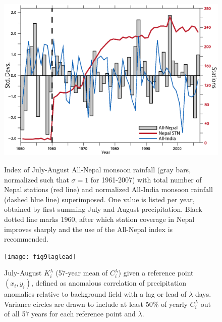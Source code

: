 \documentclass[12pt]{article}
\begin{document}
\begin{figure}[t]
  \noindent\includegraphics[width=36pc,angle=0]{fig8allnepal}\\
  \caption{Index of July-August All-Nepal monsoon rainfall (gray bars, normalized such that $\sigma= 1$ for 1961-2007) with total number of Nepal stations (red line) and normalized All-India monsoon rainfall (dashed blue line) superimposed. One value is listed per year, obtained by first summing July and August precipitation. Black dotted line marks 1960, after which station coverage in Nepal improves sharply and the use of the All-Nepal index is recommended.}\label{f8}
\end{figure}

\begin{figure}[t]
  \noindent\texttt{[image: fig9laglead]}\\
  \caption{July-August $K_i^\lambda$ (57-year mean of $C_i^\lambda$) given a reference point $(x_i,y_i)$, defined as anomalous correlation of precipitation anomalies relative to background field with a lag or lead of $\lambda$ days. Variance circles are drawn to include at least 50\% of yearly $C_i^\lambda$ out of all 57 years for each reference point and $\lambda$.}\label{f9}
\end{figure}
\end{document}
